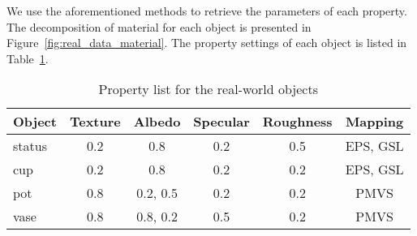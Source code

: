 We use the aforementioned methods to retrieve the parameters of each property. The decomposition of material for each object is presented in Figure~\ref{fig:real_data_material}. The property settings of each object is listed in Table~\ref{tab:real_data_prop_list}.
\begin{table}[!htbp]
  \centering
  \begin{tabular}{l*{5}{c}}
  \hline
  \textbf{Object} & Texture & Albedo & Specular & Roughness & Mapping\\
  \hline
  status & 0.2 & 0.8 & 0.2 & 0.5 & EPS, GSL\\
  cup & 0.2 & 0.8 & 0.2 & 0.2 & EPS, GSL\\
  pot & 0.8 & 0.2, 0.5 & 0.2 & 0.2 & PMVS\\
  vase & 0.8 & 0.8, 0.2 & 0.5 & 0.2 & PMVS\\
  \hline
  \end{tabular}
  \caption{Property list for the real-world objects}
  \label{tab:real_data_prop_list}
\end{table}



